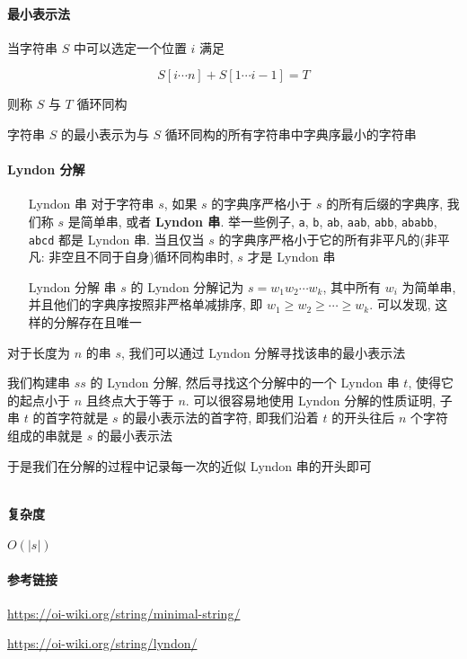 \paragraph{最小表示法}

当字符串 \(S\) 中可以选定一个位置 \(i\) 满足

\[
    S[i\cdots n]+S[1\cdots i-1]=T
\]

则称 \(S\) 与 \(T\) 循环同构

字符串 \(S\) 的最小表示为与 \(S\) 循环同构的所有字符串中字典序最小的字符串

\paragraph{Lyndon 分解}

\begin{enumerate}
    \item[Lyndon 串] 对于字符串 \(s\), 如果 \(s\) 的字典序严格小于 \(s\) 的所有后缀的字典序, 我们称 \(s\) 是简单串, 或者 \textbf{Lyndon 串}. 举一些例子, \verb|a|, \verb|b|, \verb|ab|, \verb|aab|, \verb|abb|, \verb|ababb|, \verb|abcd| 都是 Lyndon 串. 当且仅当 \(s\) 的字典序严格小于它的所有非平凡的(非平凡: 非空且不同于自身)循环同构串时, \(s\) 才是 Lyndon 串
    \item[Lyndon 分解] 串 \(s\) 的 Lyndon 分解记为 \(s=w_1w_2\cdots w_k\), 其中所有 \(w_i\) 为简单串, 并且他们的字典序按照非严格单减排序, 即 \(w_1\ge w_2\ge\cdots\ge w_k\). 可以发现, 这样的分解存在且唯一
\end{enumerate}

对于长度为 \(n\) 的串 \(s\), 我们可以通过 Lyndon 分解寻找该串的最小表示法

我们构建串 \(ss\) 的 Lyndon 分解, 然后寻找这个分解中的一个 Lyndon 串 \(t\), 使得它的起点小于 \(n\) 且终点大于等于 \(n\). 可以很容易地使用 Lyndon 分解的性质证明, 子串 \(t\) 的首字符就是 \(s\) 的最小表示法的首字符, 即我们沿着 \(t\) 的开头往后 \(n\) 个字符组成的串就是 \(s\) 的最小表示法

于是我们在分解的过程中记录每一次的近似 Lyndon 串的开头即可

\inputminted{cpp}{src/src/min_cyclic_string.txt}

\paragraph{复杂度}

\(O(|s|)\)

\paragraph{参考链接}

\url{https://oi-wiki.org/string/minimal-string/}

\url{https://oi-wiki.org/string/lyndon/}
